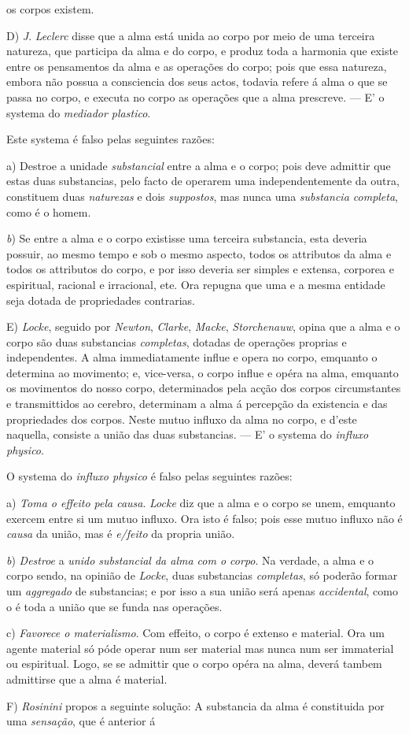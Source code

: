 os corpos existem.\par D) \emph{J}. \emph{Leclerc} disse que a alma está unida ao corpo por meio de uma terceira natureza, que participa da alma e do corpo, e produz toda a harmonia que existe entre os pensamentos da alma e as operações do corpo; pois que essa natureza, embora não possua a consciencia dos seus actos, todavia refere á alma o que se passa no corpo, e executa no corpo as operações que a alma prescreve. --- E' o systema do \emph{mediador plastico}.\par Este systema é falso pelas seguintes razões:\par a) Destroe a unidade \emph{substancial} entre a alma e o corpo; pois deve admittir que estas duas substancias, pelo facto de operarem uma independentemente da outra, constituem duas \emph{naturezas} e dois \emph{suppostos}, mas nunca uma \emph{substancia completa}, como é o homem.\par \emph{b}) Se entre a alma e o corpo existisse uma terceira substancia, esta deveria possuir, ao mesmo tempo e sob o mesmo aspecto, todos os attributos da alma e todos os attributos do corpo, e por isso deveria ser simples e extensa, corporea e espiritual, racional e irracional, ete. Ora repugna que uma e a mesma entidade seja dotada de propriedades contrarias.\par E) \emph{Locke}, seguido por \emph{Newton}, \emph{Clarke}, \emph{Macke}, \emph{Storchenauw}, opina que a alma e o corpo são duas substancias \emph{completas}, dotadas de operações proprias e independentes. A alma immediatamente influe e opera no corpo, emquanto o determina ao movimento; e, vice-versa, o corpo influe e opéra na alma, emquanto os movimentos do nosso corpo, determinados pela acção dos corpos circumstantes e transmittidos ao cerebro, determinam a alma á percepção da existencia e das propriedades dos corpos. Neste mutuo influxo da alma no corpo, e d'este naquella, consiste a união das duas substancias. --- E' o systema do \emph{influxo physico}.\par O systema do \emph{influxo physico} é falso pelas seguintes razões:\par a) \emph{Toma o effeito pela causa}. \emph{Locke} diz que a alma e o corpo se unem, emquanto exercem entre si um mutuo influxo. Ora isto é falso; pois esse mutuo influxo não é \emph{causa} da união, mas é \emph{e/feito} da propria união.\par \emph{b}) \emph{Destroe} a \emph{unido substancial da alma com o corpo}. Na verdade, a alma e o corpo sendo, na opinião de \emph{Locke}, duas substancias \emph{completas}, só poderão formar um \emph{aggregado} de substancias; e por isso a sua união será apenas \emph{accidental}, como o é toda a união que se funda nas operações.\par c) \emph{Favorece o materialismo}. Com effeito, o corpo é extenso e material. Ora um agente material só póde operar num ser material mas nunca num ser immaterial ou espiritual. Logo, se se admittir que o corpo opéra na alma, deverá tambem admittirse que a alma é material.\par F) \emph{Rosinini} propos a seguinte solução: A substancia da alma é constituida por uma \emph{sensação}, que é anterior á 